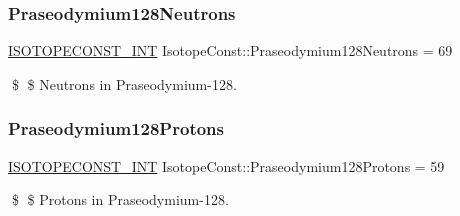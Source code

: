 \subsubsection{\texorpdfstring{Praseodymium128\+Neutrons}{Praseodymium128Neutrons}}
{\footnotesize\ttfamily \mbox{\hyperlink{group___isotope_const-_macros_ga5f18360b3e99483a35c32d789e62621c}{I\+S\+O\+T\+O\+P\+E\+C\+O\+N\+S\+T\+\_\+\+I\+NT}} Isotope\+Const\+::\+Praseodymium128\+Neutrons = 69}

\$ \$ Neutrons in Praseodymium-\/128. \mbox{\label{group___isotope_const-_praseodymium-_pr128_ga239dceb6868cce772c8a558772713e80}} 
\subsubsection{\texorpdfstring{Praseodymium128\+Protons}{Praseodymium128Protons}}
{\footnotesize\ttfamily \mbox{\hyperlink{group___isotope_const-_macros_ga5f18360b3e99483a35c32d789e62621c}{I\+S\+O\+T\+O\+P\+E\+C\+O\+N\+S\+T\+\_\+\+I\+NT}} Isotope\+Const\+::\+Praseodymium128\+Protons = 59}

\$ \$ Protons in Praseodymium-\/128. 